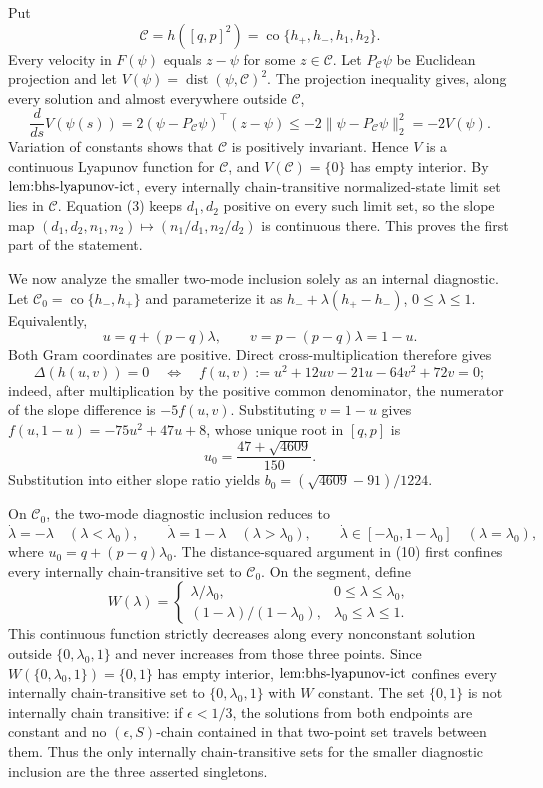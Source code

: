 Put
\[
 \mathcal C=h([q,p]^2)=\operatorname{co}\{h_+,h_-,h_1,h_2\}.
\]
Every velocity in \(F(\psi)\) equals \(z-\psi\) for some \(z\in\mathcal C\). Let \(P_{\mathcal C}\psi\) be Euclidean projection and let \(V(\psi)=\operatorname{dist}(\psi,\mathcal C)^2\). The projection inequality gives, along every solution and almost everywhere outside \(\mathcal C\),
\[
 \frac{d}{ds}V(\psi(s))
 =2(\psi-P_{\mathcal C}\psi)^\top(z-\psi)
 \le-2\|\psi-P_{\mathcal C}\psi\|_2^2=-2V(\psi). \tag{10}
\]
Variation of constants shows that \(\mathcal C\) is positively invariant. Hence \(V\) is a continuous Lyapunov function for \(\mathcal C\), and \(V(\mathcal C)=\{0\}\) has empty interior. By \(\textnormal{lem:bhs-lyapunov-ict}\), every internally chain-transitive normalized-state limit set lies in \(\mathcal C\). Equation (3) keeps \(d_1,d_2\) positive on every such limit set, so the slope map \((d_1,d_2,n_1,n_2)\mapsto(n_1/d_1,n_2/d_2)\) is continuous there. This proves the first part of the statement.

We now analyze the smaller two-mode inclusion solely as an internal diagnostic. Let \(\mathcal C_0=\operatorname{co}\{h_-,h_+\}\) and parameterize it as \(h_-+\lambda(h_+-h_-)\), \(0\le\lambda\le1\). Equivalently,
\[
 u=q+(p-q)\lambda,\qquad v=p-(p-q)\lambda=1-u. \tag{11}
\]
Both Gram coordinates are positive. Direct cross-multiplication therefore gives
\[
 \Delta(h(u,v))=0
 \quad\Longleftrightarrow\quad
 f(u,v):=u^2+12uv-21u-64v^2+72v=0; \tag{12}
\]
indeed, after multiplication by the positive common denominator, the numerator of the slope difference is \(-5f(u,v)\). Substituting \(v=1-u\) gives \(f(u,1-u)=-75u^2+47u+8\), whose unique root in \([q,p]\) is
\[
 u_0=\frac{47+\sqrt{4609}}{150}.
\]
Substitution into either slope ratio yields \(b_0=(\sqrt{4609}-91)/1224\).

On \(\mathcal C_0\), the two-mode diagnostic inclusion reduces to
\[
 \dot\lambda=-\lambda\quad(\lambda<\lambda_0),\qquad
 \dot\lambda=1-\lambda\quad(\lambda>\lambda_0),\qquad
 \dot\lambda\in[-\lambda_0,1-\lambda_0]\quad(\lambda=\lambda_0), \tag{13}
\]
where \(u_0=q+(p-q)\lambda_0\). The distance-squared argument in (10) first confines every internally chain-transitive set to \(\mathcal C_0\). On the segment, define
\[
 W(\lambda)=
 \begin{cases}
 \lambda/\lambda_0,&0\le\lambda\le\lambda_0,\\
 (1-\lambda)/(1-\lambda_0),&\lambda_0\le\lambda\le1.
 \end{cases}
\]
This continuous function strictly decreases along every nonconstant solution outside \(\{0,\lambda_0,1\}\) and never increases from those three points. Since \(W(\{0,\lambda_0,1\})=\{0,1\}\) has empty interior, \(\textnormal{lem:bhs-lyapunov-ict}\) confines every internally chain-transitive set to \(\{0,\lambda_0,1\}\) with \(W\) constant. The set \(\{0,1\}\) is not internally chain transitive: if \(\epsilon<1/3\), the solutions from both endpoints are constant and no \((\epsilon,S)\)-chain contained in that two-point set travels between them. Thus the only internally chain-transitive sets for the smaller diagnostic inclusion are the three asserted singletons.

